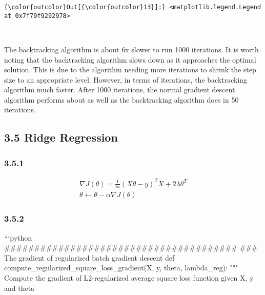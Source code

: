 \documentclass[11pt]{article}
\begin{document}
\begin{Verbatim}[commandchars=\\\{\}]
{\color{outcolor}Out[{\color{outcolor}13}]:} <matplotlib.legend.Legend at 0x7f79f9292978>
\end{Verbatim}
            
    \begin{center}
    \end{center}
    { \hspace*{\fill} \\}
    
    The backtracking algorithm is about 6x slower to run 1000 iterations. It
is worth noting that the backtracking algorithm slows down as it
approaches the optimal solution. This is due to the algorithm needing
more iterations to shrink the step size to an appropriate level.
However, in terms of iterations, the backtracking algorithm much faster.
After 1000 iterations, the normal gradient descent algorithm performs
about as well as the backtracking algorithm does in 50 iterations.

    \subsection{3.5 Ridge Regression}\label{ridge-regression}

    \subsubsection{3.5.1}\label{section}

    \begin{align}
\nabla J(\theta) = \frac{1}{m} (X\theta - y)^TX + 2\lambda \theta^T\\
\theta \leftarrow \theta - \alpha \nabla J(\theta)
\end{align}

    \subsubsection{3.5.2}\label{section}

    ```python
\#\#\#\#\#\#\#\#\#\#\#\#\#\#\#\#\#\#\#\#\#\#\#\#\#\#\#\#\#\#\#\#\#\#\#\#\#\#\#
\#\#\# The gradient of regularized batch gradient descent def
compute\_regularized\_square\_loss\_gradient(X, y, theta, lambda\_reg):
""" Compute the gradient of L2-regularized average square loss function
given X, y and theta
\end{document}
